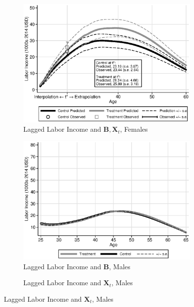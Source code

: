 \begin{figure}
\begin{subfigure}[h]{0.3\textwidth}
	\caption{Lagged Labor Income and $\bm{B}, \bm{X}_{t}$, Females}
		\includegraphics[width=\textwidth]{output/labor_25-65_pset1_mset3_female.eps}
\end{subfigure}
\begin{subfigure}[h]{0.3\textwidth}
		\centering
		\caption{Lagged Labor Income and $\bm{B}$, Males}
		\includegraphics[width=\textwidth]{output/labor_25-65_pset3_mset3_male.eps}
\end{subfigure}%
\begin{subfigure}[h]{0.3\textwidth}
	\centering
	\caption{Lagged Labor Income and $\bm{X}_{t}$, Males}

\end{subfigure}
\end{figure}
